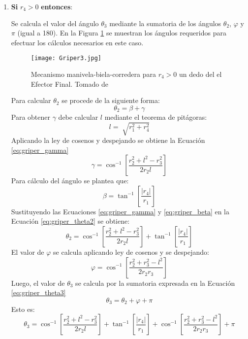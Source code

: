 \begin{enumerate}
\item \textbf{Si} $r_4>0$ \textbf{entonces}:

Se calcula el valor del ángulo $\theta_3$ mediante la sumatoria de los ángulos $\theta_2$, $\varphi$ y $\pi$  (igual a 180). En la Figura \ref{fig:Griper_MBC1} se muestran los ángulos requeridos para efectuar los cálculos necesarios en este caso.
\begin{figure}[htb]
    \centering
     \texttt{[image: Griper3.jpg]}
    \caption [Mecanismo manivela-biela-corredera para $r_4 > 0$ en un dedo del Efector Final.]{Mecanismo manivela-biela-corredera para $r_4 > 0$ un dedo del el Efector Final. Tomado de \cite{zapata_zapata_control_2017} }
    \label{fig:Griper_MBC1}
\end{figure}

Para calcular $\theta_2$ se procede de la siguiente forma:
\begin{equation}\label{eq:griper_theta2}
\theta_2=\beta+\gamma
\end{equation}
Para obtener $\gamma$ debe calcular $l$ mediante el teorema de pitágoras:
\begin{equation}
l=\sqrt[]{r^2_1 +r^2_4}
\end{equation}
Aplicando la ley de cosenos y despejando se obtiene la Ecuación \ref{eq:griper_gamma} 
\begin{equation} \label{eq:griper_gamma}
\gamma=\cos^{-1}\left[  \frac{r^2_2 +l^2-r^2_3}{2r_2l}\right]
\end{equation}
Para cálculo  del ángulo se plantea que:
\begin{equation}\label{eq:griper_beta} 
\beta=\tan^{-1}\left[  \frac{|r_4|}{r_1}\right]
\end{equation}
Sustituyendo las Ecuaciones \ref{eq:griper_gamma} y \ref{eq:griper_beta} en la Ecuación \ref{eq:griper_theta2} se obtiene:
\begin{equation}\label{eq:griper_theta22}
\theta_2=  \cos^{-1}\left[  \frac{r^2_2 +l^2-r^2_3}{2r_2l}\right]+ \tan^{-1}\left[  \frac{|r_4|}{r_1}\right]
\end{equation}
El valor de $\varphi$ se calcula aplicando ley de cosenos y se despejando:
\begin{equation}\label{eq:griper_varphi}
\varphi=\cos^{-1}\left[ \frac{r^2_2 +r^2_3-l^2}{2r_2r_3}\right]
\end{equation}
Luego, el valor de $\theta_3$ se calcula por la sumatoria expresada en la Ecuación \ref{eq:griper_theta3}
\begin{equation}\label{eq:griper_theta3}
\theta_3=\theta_2+\varphi+\pi
\end{equation}
Esto es:
\begin{equation}\label{eq:griper_theta32}
\theta_3= \cos^{-1}\left[  \frac{r^2_2 +l^2-r^2_3}{2r_2l}\right]+ \tan^{-1}\left[  \frac{|r_4|}{r_1}\right]+\cos^{-1}\left[ \frac{r^2_2 +r^2_3-l^2}{2r_2r_3}\right]+\pi
\end{equation}


\end{enumerate}
